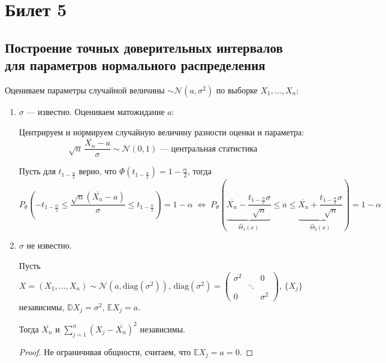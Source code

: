 \section{Билет 5}

\subsection{Построение точных доверительных интервалов для параметров нормального распределения}

Оцениваем параметры случайной величины $\sim \mathcal{N}(a, \sigma^2)$ по выборке $X_1, \dots, X_n$:
\begin{enumerate}
	\item $\sigma$ --- известно. Оцениваем матожидание $a$:
	
	Центрируем и нормируем случайную величину разности оценки и параметра:
	\[ \sqrt{n}\,\frac{\overline{X_n} - a}{\sigma} \sim \mathcal{N}(0, 1) \text{ --- центральная статистика} \]
	
	Пусть для $t_{1-\frac{\alpha}2}$ верно, что $\Phi \left( t_{1 - \frac{\alpha}2} \right) = 1 - \frac{\alpha}2$, тогда 
	\[ P_{\theta} \left( -t_{1 - \frac{\alpha}2} \le \frac{\sqrt{n}(\overline{X_n} - a)}{\sigma} \le t_{1 - \frac{\alpha}2} \right) = 
	1 - \alpha \;\Leftrightarrow\; 
	P_{\theta} \left( \underset{\hat\Theta_1(x)}{\underbrace{\overline{X_n} - \frac{t_{1 - \frac{\alpha}2} \sigma}{\sqrt{n}}}} \le a \le 
	\underset{\hat\Theta_2(x)}{\underbrace{\overline{X_n} + \frac{t_{1 - \frac{\alpha}2} \sigma}{\sqrt{n}}}} \right) = 1 - \alpha \]
	
	\item $\sigma$ не известно.
	
	\begin{lemma*}
		Пусть $X \!=\! (X_1, \dots, X_n) \sim \mathcal{N} \left( a, \text{diag}(\sigma^2) \right), \, \text{diag}(\sigma^2) \!=\! 
		\left(\begin{matrix} \sigma^2 && 0 \\[-5 pt] & \!\!\!\!\!\ddots\!\!\!\!\! & \\[-5 pt] 0 && \sigma^2 \end{matrix}\right)\!\!, \, \{ X_j \}$ независимы, $\mathbb{D} X_j \!=\! \sigma^2\!, \, \mathbb{E} X_j \!=\! a$.
		
		Тогда $\overline{X_n}$ и $\sum_{j=1}^n (X_j - \overline{X_n})^2$ независимы.
	\end{lemma*}
	\begin{proof}
		Не ограничивая общности, считаем, что $\mathbb{E} X_j = a = 0$.
		

\end{proof}
\end{enumerate}
